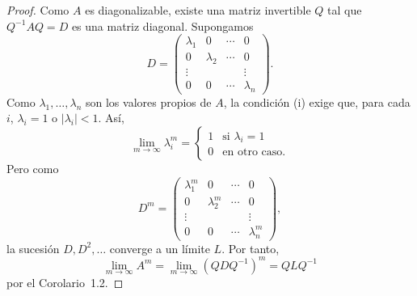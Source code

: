 \documentclass[12pt,a4paper]{book}
\begin{document}
    \begin{proof}
        Como $A$ es diagonalizable, existe una matriz invertible $Q$ tal que $Q^{-1}AQ=D$ es una matriz diagonal. Supongamos
        \begin{equation*}
            D=\begin{pmatrix}\lambda_1&0&\cdots&0\\0&\lambda_2&\cdots&0\\\vdots&&&\vdots\\0&0&\cdots&\lambda_n\end{pmatrix}.
        \end{equation*}
        Como $\lambda_1,\dots,\lambda_n$ son los valores propios de $A$, la condición (i) exige que, para cada $i$, $\lambda_i=1$ o $|\lambda_i|<1$. Así,
        \begin{equation*}
            \lim_{m\to\infty}\lambda_i^m=\begin{cases}1&\text{si }\lambda_i=1\\0&\text{en otro caso.}\end{cases}
        \end{equation*}
        Pero como
        \begin{equation*}
            D^m=\begin{pmatrix}\lambda_1^m&0&\cdots&0\\0&\lambda_2^m&\cdots&0\\\vdots&&&\vdots\\0&0&\cdots&\lambda_n^m\end{pmatrix},
        \end{equation*}
        la sucesión $D,D^2,\dots$ converge a un límite $L$. Por tanto,
        \begin{equation*}
            \lim_{m\to\infty}A^m=\lim_{m\to\infty}(QDQ^{-1})^m=QLQ^{-1}
        \end{equation*}
        por el Corolario~1.2.
    \end{proof}
\end{document}
